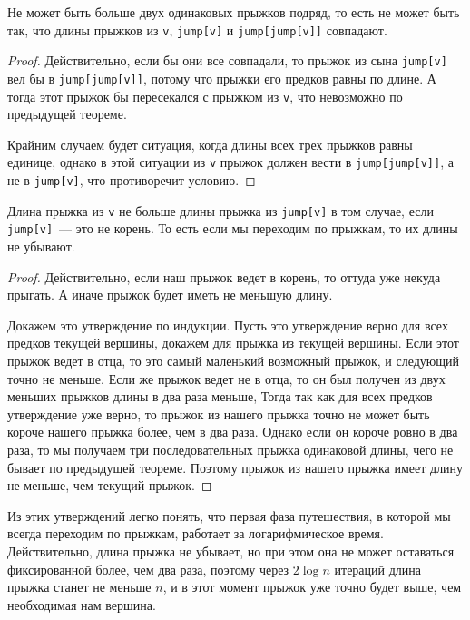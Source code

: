 \begin{theorem}
    Не может быть больше двух одинаковых прыжков подряд, то есть не может быть так, что длины прыжков из \verb+v+, \verb+jump[v]+ и \verb+jump[jump[v]]+ совпадают.
\end{theorem}

\begin{proof}
    Действительно, если бы они все совпадали, то прыжок из сына \verb+jump[v]+ вел бы в \verb+jump[jump[v]]+, потому что прыжки его предков равны по длине. А тогда этот прыжок бы пересекался с прыжком из \verb+v+, что невозможно по предыдущей теореме.

    Крайним случаем будет ситуация, когда длины всех трех прыжков равны единице, однако в этой ситуации из \verb+v+ прыжок должен вести в \verb+jump[jump[v]]+, а не в \verb+jump[v]+, что противоречит условию.
\end{proof}

\begin{theorem}
    Длина прыжка из \verb+v+ не больше длины прыжка из \verb+jump[v]+ в том случае, если \verb+jump[v]+~--- это не корень. То есть если мы переходим по прыжкам, то их длины не убывают.
\end{theorem}

\begin{proof}
    Действительно, если наш прыжок ведет в корень, то оттуда уже некуда прыгать. А иначе прыжок будет иметь не меньшую длину.

    Докажем это утверждение по индукции. Пусть это утверждение верно для всех предков текущей вершины, докажем для прыжка из текущей вершины.
    Если этот прыжок ведет в отца, то это самый маленький возможный прыжок, и следующий точно не меньше.
    Если же прыжок ведет не в отца, то он был получен из двух меньших прыжков длины в два раза меньше, Тогда так как для всех предков утверждение уже верно, то прыжок из нашего прыжка точно не может быть короче нашего прыжка более, чем в два раза. Однако если он короче ровно в два раза, то мы получаем три последовательных прыжка одинаковой длины, чего не бывает по предыдущей теореме. Поэтому прыжок из нашего прыжка имеет длину не меньше, чем текущий прыжок.
\end{proof}

Из этих утверждений легко понять, что первая фаза путешествия, в которой мы всегда переходим по прыжкам, работает за логарифмическое время. Действительно, длина прыжка не убывает, но при этом она не может оставаться фиксированной более, чем два раза, поэтому через $2 \log n$ итераций длина прыжка станет не меньше $n$, и в этот момент прыжок уже точно будет выше, чем необходимая нам вершина.

